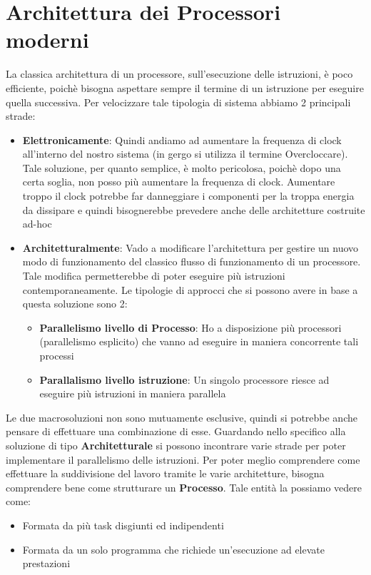 \section{Architettura dei Processori moderni}
La classica architettura di un processore, sull'esecuzione delle istruzioni, è poco efficiente, poichè bisogna aspettare sempre il termine di un istruzione per eseguire quella successiva.
Per velocizzare tale tipologia di sistema abbiamo 2 principali strade:
\begin{itemize}
    \item \textbf{Elettronicamente}: Quindi andiamo ad aumentare la frequenza di clock all'interno del nostro sistema (in gergo si utilizza il termine Overcloccare). Tale soluzione, per quanto semplice, è molto pericolosa, poichè dopo una certa soglia, non posso più aumentare la frequenza di clock. Aumentare troppo il clock potrebbe far danneggiare i componenti per la troppa energia da dissipare e quindi bisognerebbe prevedere anche delle architetture costruite ad-hoc
    
    \item \textbf{Architetturalmente}: Vado a modificare l'architettura per gestire un nuovo modo di funzionamento del classico flusso di funzionamento di un processore. Tale modifica permetterebbe di poter eseguire più istruzioni contemporaneamente. Le tipologie di approcci che si possono avere in base a questa soluzione sono 2:
    \begin{itemize}
        \item \textbf{Parallelismo livello di Processo}: Ho a disposizione più processori (parallelismo esplicito) che vanno ad eseguire in maniera concorrente tali processi
        \item \textbf{Parallalismo livello istruzione}: Un singolo processore riesce ad eseguire più istruzioni in maniera parallela
    \end{itemize}
\end{itemize}

Le due macrosoluzioni non sono mutuamente esclusive, quindi si potrebbe anche pensare di effettuare una combinazione di esse.
Guardando nello specifico alla soluzione di tipo \textbf{Architetturale} si possono incontrare varie strade per poter implementare il parallelismo delle istruzioni.
Per poter meglio comprendere come effettuare la suddivisione del lavoro tramite le varie architetture, bisogna comprendere bene come strutturare un \textbf{Processo}. Tale entità la possiamo vedere come:
\begin{itemize}
    \item Formata da più task disgiunti ed indipendenti
    \item Formata da un solo programma che richiede un'esecuzione ad elevate prestazioni
\end{itemize}

